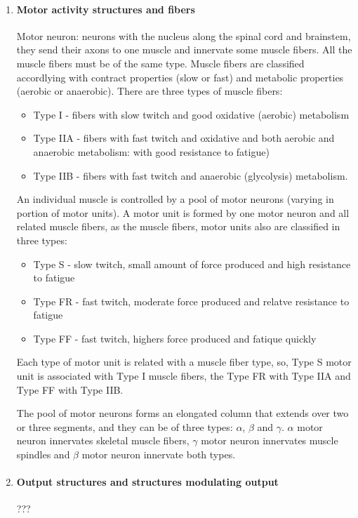 \documentclass[12pt,article,oneside,a4paper]{memoir}
\begin{document}
\begin{enumerate}
\item \paragraph{Motor activity structures and fibers}
Motor neuron: neurons with the nucleus along the spinal cord and brainstem, they send their axons to one muscle and innervate some muscle fibers. All the muscle fibers must be of the same type.
Muscle fibers are classified accordlying with contract properties (slow or fast) and metabolic properties (aerobic or anaerobic). There are three types of muscle fibers:
\begin{itemize}
\item Type I - fibers with slow twitch and good oxidative (aerobic) metabolism
\item Type IIA - fibers with fast twitch and oxidative and both aerobic and anaerobic metabolism: with good resistance to fatigue)
\item Type IIB - fibers with fast twitch and anaerobic (glycolysis) metabolism.
\end{itemize}

An individual muscle is controlled by a pool of motor neurons (varying in portion of motor units).
A motor unit is formed by one motor neuron and all related muscle fibers, as the muscle fibers, motor units also are classified in three types:
\begin{itemize}
\item Type S - slow twitch, small amount of force produced and high resistance to fatigue
\item Type FR - fast twitch, moderate force produced and relatve resistance to fatigue
\item Type FF - fast twitch, highers force produced and fatique quickly
\end{itemize}

Each type of motor unit is related with a muscle fiber type, so, Type S motor unit is associated with Type I muscle fibers, the Type FR with Type IIA and Type FF with Type IIB.

The pool of motor neurons forms an elongated column that extends over two or three segments, and they can be of three types: $\alpha$, $\beta$ and $\gamma$. $\alpha$ motor neuron innervates skeletal muscle fibers, $\gamma$ motor neuron innervates muscle spindles and $\beta$ motor neuron innervate both types.

\item \paragraph{Output structures and structures modulating output} ???


\end{enumerate}
\end{document}
